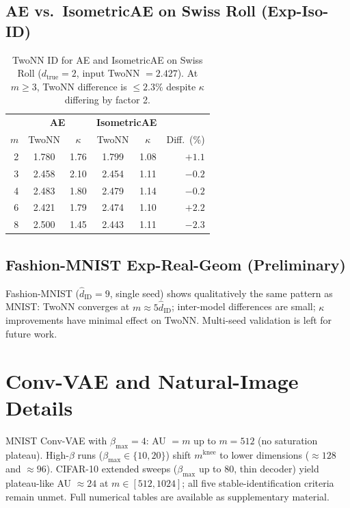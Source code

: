 \documentclass[make,article,submit,pdftex,moreauthors]{Definitions/mdpi}
\newcommand{\dtrue}{d_{\mathrm{true}}}
\newcommand{\kap}{\kappa}
\newcommand{\mknee}{m^{\mathrm{knee}}}
\newcommand{\hatdID}{\hat{d}_{\mathrm{ID}}}
\begin{document}
\subsection{AE vs.\ IsometricAE on Swiss Roll (Exp-Iso-ID)}

\begin{table}[H]
\caption{TwoNN ID for AE and IsometricAE on Swiss Roll
($\dtrue = 2$, input TwoNN $= 2.427$).
At $m \geq 3$, TwoNN difference is $\leq 2.3\%$ despite $\kap$ differing
by factor 2.\label{tab:iso_id}}
\small
\begin{tabular}{rcc|cc|r}
\toprule
 & \multicolumn{2}{c|}{\textbf{AE}} &
   \multicolumn{2}{c|}{\textbf{IsometricAE}} & \\
$m$ & TwoNN & $\kap$ & TwoNN & $\kap$ & Diff.\ (\%) \\
\midrule
2 & 1.780 & 1.76 & 1.799 & 1.08 & $+1.1$ \\
3 & 2.458 & 2.10 & 2.454 & 1.11 & $-0.2$ \\
4 & 2.483 & 1.80 & 2.479 & 1.14 & $-0.2$ \\
6 & 2.421 & 1.79 & 2.474 & 1.10 & $+2.2$ \\
8 & 2.500 & 1.45 & 2.443 & 1.11 & $-2.3$ \\
\bottomrule
\end{tabular}
\end{table}

\subsection{Fashion-MNIST Exp-Real-Geom (Preliminary)}

Fashion-MNIST ($\hatdID = 9$, single seed) shows qualitatively the same
pattern as MNIST: TwoNN converges at $m \approx 5\hatdID$; inter-model
differences are small; $\kap$ improvements have minimal effect on TwoNN.
Multi-seed validation is left for future work.

\section[\appendixname~\thesection]{Conv-VAE and Natural-Image Details}\label{app:convvae}

MNIST Conv-VAE with $\beta_{\max} = 4$: AU $= m$ up to $m = 512$ (no
saturation plateau).
High-$\beta$ runs ($\beta_{\max} \in \{10, 20\}$) shift $\mknee$ to lower
dimensions ($\approx 128$ and $\approx 96$).
CIFAR-10 extended sweeps ($\beta_{\max}$ up to 80, thin decoder) yield
plateau-like AU $\approx 24$ at $m \in [512, 1024]$; all five
stable-identification criteria remain unmet.
Full numerical tables are available as supplementary material.
\end{document}
